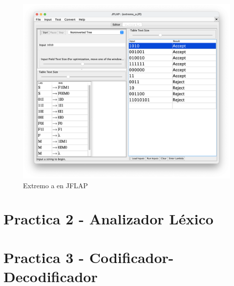 \begin{figure}[H] 
	\centering
	\includegraphics[scale=0.35]{../practica_1/images/extremo_a.png} 
	\caption{Extremo a en JFLAP} 
    \label{fig:extremo_a}
\end{figure}

\newpage
\section{Practica 2 - Analizador Léxico}

\newpage
\section{Practica 3 - Codificador-Decodificador}



